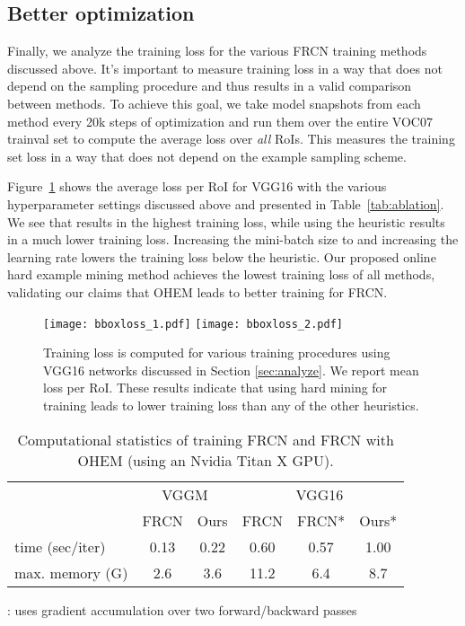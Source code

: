 \documentclass[10pt,twocolumn,letterpaper]{article}
\begin{document}
\subsection{Better optimization}
Finally, we analyze the training loss for the various FRCN training methods discussed above. It's important to measure training loss in a way that does not depend on the sampling procedure and thus results in a valid comparison between methods. To achieve this goal, we take model snapshots from each method every 20k steps of optimization and run them over the entire VOC07 trainval set to compute the average loss over \emph{all} RoIs. This measures the training set loss in a way that does not depend on the example sampling scheme.

Figure~\ref{fig:lossgraph} shows the average loss per RoI for VGG16 with the various hyperparameter settings discussed above and presented in Table~\ref{tab:ablation}. We see that  results in the highest training loss, while using the heuristic  results in a much lower training loss. Increasing the mini-batch size to  and increasing the learning rate lowers the training loss below the  heuristic. Our proposed online hard example mining method achieves the lowest training loss of all methods, validating our claims that OHEM leads to better training for FRCN.

\begin{figure}[t]
	\centering
	\texttt{[image: bboxloss\_1.pdf]}
	\texttt{[image: bboxloss\_2.pdf]}
	\caption[caption]{Training loss is computed for various training procedures using VGG16 networks discussed in Section \protect\ref{sec:analyze}. We report mean loss per RoI. These results indicate that using hard mining for training leads to lower training loss than any of the other heuristics.}
	\label{fig:lossgraph}
\end{figure}

\begin{table}[t]
	\centering
	\small
	\caption[caption]{Computational statistics of training FRCN \protect\cite{frcn} and FRCN with OHEM (using an Nvidia Titan X GPU).}
	\vspace{-0.05in}
	\begin{tabular}{@{}l c c c c c@{}}
		\toprule
		& \multicolumn{2}{c}{VGGM} & \multicolumn{3}{c}{VGG16}\\
		\cmidrule(l{1pt}r{2pt}){2-3}\cmidrule(l{2pt}){4-6}
		& FRCN & Ours & FRCN & FRCN* & Ours*\\
		\midrule
		time (sec/iter)& 0.13 & 0.22 & 0.60 & 0.57 & 1.00 \\
		max. memory (G) & 2.6 & 3.6 & 11.2 & 6.4 & 8.7 \\
		\bottomrule
	\end{tabular}
	{\small *: uses gradient accumulation over two forward/backward passes}
	\vspace{-0.1in}
	\label{tab:stats}
\end{table}
\end{document}
